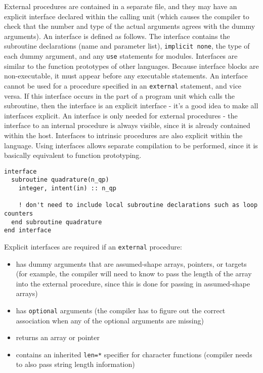 \documentclass[10pt]{article}
\begin{document}
External procedures are contained in a separate file, and they may have an explicit interface declared within the calling unit (which causes the compiler to check that the number and type of the actual arguments agrees with the dummy arguments). An interface is defined as follows. The interface contains the subroutine declarations (name and parameter list), {\tt implicit none}, the type of each dummy argument, and any {\tt use} statements for modules. Interfaces are similar to the function prototypes of other languages. Because interface blocks are non-executable, it must appear before any executable statements. An interface cannot be used for a procedure specified in an {\tt external} statement, and vice versa. If this interface occurs in the part of a program unit which calls the subroutine, then the interface is an explicit interface - it's a good idea to make all interfaces explicit. An interface is only needed for external procedures - the interface to an internal procedure is always visible, since it is already contained within the host. Interfaces to intrinsic procedures are also explicit within the language. Using interfaces allows separate compilation to be performed, since it is basically equivalent to function prototyping. 

\begin{lstlisting}
interface
  subroutine quadrature(n_qp)
    integer, intent(in) :: n_qp
    
    ! don't need to include local subroutine declarations such as loop counters
  end subroutine quadrature
end interface
\end{lstlisting}

Explicit interfaces are required if an {\tt external} procedure:

\begin{itemize}
\item has dummy arguments that are assumed-shape arrays, pointers, or targets (for example, the compiler will need to know to pass the length of the array into the external procedure, since this is done for passing in assumed-shape arrays)
\item has {\tt optional} arguments (the compiler has to figure out the correct association when any of the optional arguments are missing)
\item returns an array or pointer
\item contains an inherited {\tt len=*} specifier for character functions (compiler needs to also pass string length information)
\end{itemize}
\end{document}
